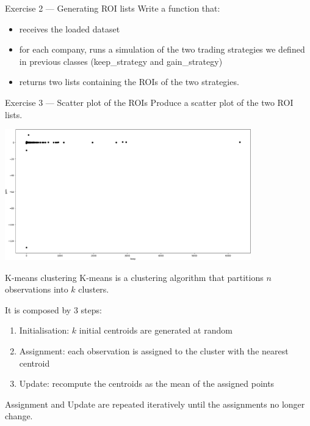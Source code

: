 \documentclass[aspectratio=169,]{beamer}
\begin{document}
\begin{frame}{Exercise 2 --- Generating ROI lists}
    Write a function that:
    \begin{itemize}
        \item receives the loaded dataset
        \item for each company, runs a simulation of the two trading strategies we defined in previous classes
            (keep\_strategy and gain\_strategy)
        \item returns two lists containing the ROIs of the two strategies.
    \end{itemize}
\end{frame}

\begin{frame}{Exercise 3 --- Scatter plot of the ROIs}
    Produce a scatter plot of the two ROI lists.

    \includegraphics[width=0.8\textwidth]{./scatterplot.png}
\end{frame}

\begin{frame}{K-means clustering}
    K-means is a clustering algorithm that partitions $n$ observations into $k$ clusters.

    It is composed by 3 steps:
    \begin{enumerate}
        \item Initialisation: $k$ initial centroids are generated at random
        \item Assignment: each observation is assigned to the cluster with the nearest centroid
        \item Update: recompute the centroids as the mean of the assigned points
    \end{enumerate}

    Assignment and Update are repeated iteratively until the assignments no longer change.
\end{frame}
\end{document}
